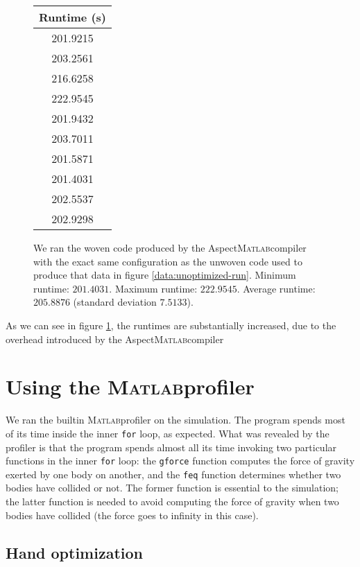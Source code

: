 \documentclass[11pt,letterpaper]{article}
\newcommand{\matlab}{\textsc{Matlab}}
\begin{document}
\begin{figure}[ht]
    \centering
    \begin{tabular}{|c|}
        \textbf{Runtime (s)} \\ \hline \hline
        201.9215 \\
        203.2561 \\
        216.6258 \\
        222.9545 \\
        201.9432 \\
        203.7011 \\
        201.5871 \\
        201.4031 \\
        202.5537 \\
        202.9298 \\
    \end{tabular}

    \caption{
        We ran the woven code produced by the Aspect\matlab compiler with the
        exact same configuration as the unwoven code used to produce that data
        in figure \ref{data:unoptimized-run}.
        Minimum runtime: $201.4031$.
        Maximum runtime: $222.9545$.
        Average runtime: $205.8876$ (standard deviation $7.5133$).
    }
    \label{fig:wovenrun}
\end{figure}

As we can see in figure \ref{fig:wovenrun}, the runtimes are substantially
increased, due to the overhead introduced by the Aspect\matlab compiler

\section{Using the \matlab profiler}

We ran the builtin \matlab profiler on the simulation. The program spends most
of its time inside the inner \texttt{for} loop, as expected. What was revealed
by the profiler is that the program spends almost all its time invoking two
particular functions in the inner \texttt{for} loop: the \texttt{gforce}
function computes the force of gravity exerted by one body on another, and the
\texttt{feq} function determines whether two bodies have collided or not. The
former function is essential to the simulation; the latter function is needed
to avoid computing the force of gravity when two bodies have collided (the
force goes to infinity in this case).

\subsection{Hand optimization}
\end{document}
